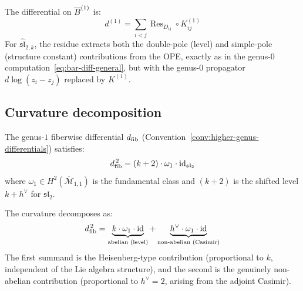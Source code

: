 The differential on $\overline{B}^{(1)}$ is:
\begin{equation}\label{eq:genus1-diff}
d^{(1)} = \sum_{i<j} \operatorname{Res}_{D_{ij}} \circ K^{(1)}_{ij}
\end{equation}
For $\widehat{\mathfrak{sl}}_{2,k}$, the residue extracts both the double-pole (level) and simple-pole (structure constant) contributions from the OPE, exactly as in the genus-0 computation~\eqref{eq:bar-diff-general}, but with the genus-0 propagator $d\log(z_i-z_j)$ replaced by $K^{(1)}$.

\subsection{Curvature decomposition}

\begin{theorem}
\label{thm:sl2-genus1-curvature}
The genus-$1$ fiberwise differential
$d_{\mathrm{fib}}$ \textup{(}Convention~\textup{\ref{conv:higher-genus-differentials})} satisfies:
\begin{equation}\label{eq:sl2-genus1-dsquared}
d_{\mathrm{fib}}^{\,2} = (k+2) \cdot \omega_1 \cdot \operatorname{id}_{\mathfrak{sl}_2}
\end{equation}
where $\omega_1 \in H^2(\overline{\mathcal{M}}_{1,1})$ is the fundamental class and $(k+2)$ is the shifted level $k + h^\vee$ for $\mathfrak{sl}_2$.

The curvature decomposes as:
\begin{equation}\label{eq:curvature-decomposition}
d_{\mathrm{fib}}^{\,2} = \underbrace{k \cdot \omega_1 \cdot \operatorname{id}}_{\text{abelian (level)}} + \underbrace{h^\vee \cdot \omega_1 \cdot \operatorname{id}}_{\text{non-abelian (Casimir)}}
\end{equation}
The first summand is the Heisenberg-type contribution (proportional to $k$, independent of the Lie algebra structure), and the second is the genuinely non-abelian contribution (proportional to $h^\vee=2$, arising from the adjoint Casimir).
\end{theorem}


